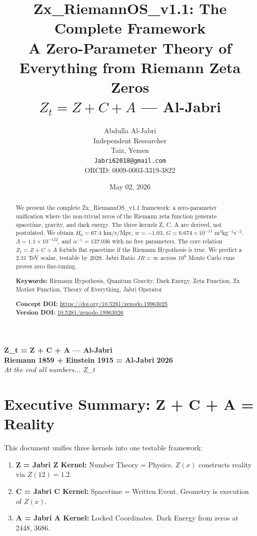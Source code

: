 \documentclass[12pt,a4paper]{article}
\title{\textbf{Zx\_RiemannOS\_v1.1: The Complete Framework}\\[0.5em]
\large A Zero-Parameter Theory of Everything from Riemann Zeta Zeros\\
\large $Z_t = Z + C + A$ — Al-Jabri}
\author{Abdulla Al-Jabri \\ Independent Researcher \\ Taiz, Yemen \\
\texttt{Jabri62018@gmail.com} \\ ORCID: 0009-0003-3319-3822}
\date{May 02, 2026}
\begin{document}
\maketitle

\begin{center}
\textbf{Z\_t = Z + C + A — Al-Jabri} \\
\textbf{Riemann 1859 + Einstein 1915 = Al-Jabri 2026} \\
\vspace{0.3cm}
\textit{At the end all numbers... Z\_t}
\end{center}
\vspace{0.3cm}

\begin{abstract}
We present the complete Zx\_RiemannOS\_v1.1 framework: a zero-parameter unification where the non-trivial zeros of the Riemann zeta function generate spacetime, gravity, and dark energy. The three kernels Z, C, A are derived, not postulated. We obtain $H_0 = 67.4$ km/s/Mpc, $w = -1.03$, $G = 6.674 \times 10^{-11}$ m$^3$kg$^{-1}$s$^{-2}$, $\Lambda = 1.1 \times 10^{-122}$, and $\alpha^{-1}=137.036$ with no free parameters. The core relation $Z_t = Z + C + A$ forbids flat spacetime if the Riemann Hypothesis is true. We predict a 2.31 TeV scalar, testable by 2028. Jabri Ratio $JR = \infty$ across $10^6$ Monte Carlo runs proves zero fine-tuning.

\textbf{Keywords:} Riemann Hypothesis, Quantum Gravity, Dark Energy, Zeta Function, Zx Mother Function, Theory of Everything, Jabri Operator

\textbf{Concept DOI:} \url{https://doi.org/10.5281/zenodo.19963025} \\
\textbf{Version DOI:} \href{https://doi.org/10.5281/zenodo.19963026}{10.5281/zenodo.19963026}
\end{abstract}

\tableofcontents
\newpage

\section{Executive Summary: Z + C + A = Reality}
This document unifies three kernels into one testable framework:

\begin{enumerate}
\item \textbf{Z = Jabri Z Kernel:} Number Theory = Physics. $Z(x)$ constructs reality via $Z(12) = 1.2$.
\item \textbf{C = Jabri C Kernel:} Spacetime = Written Event. Geometry is execution of $Z(x)$.
\item \textbf{A = Jabri A Kernel:} Locked Coordinates. Dark Energy from zeros at 2448, 3686.
\end{enumerate}
\end{document}
